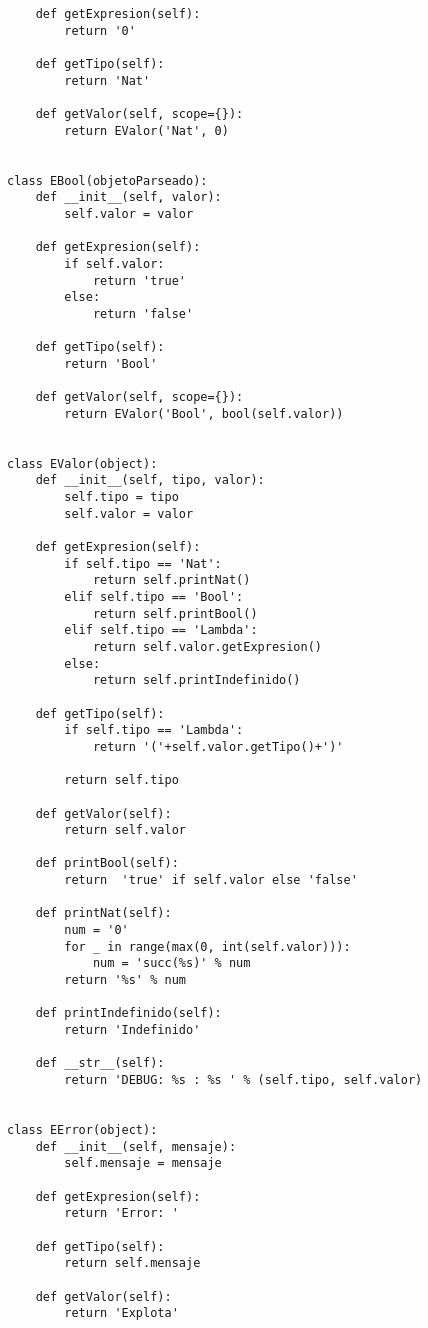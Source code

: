 \begin{verbatim}
    def getExpresion(self):
        return '0'
    
    def getTipo(self):
        return 'Nat'
    
    def getValor(self, scope={}):
        return EValor('Nat', 0)
    

class EBool(objetoParseado):
    def __init__(self, valor):
        self.valor = valor

    def getExpresion(self):
        if self.valor:
            return 'true'
        else:
            return 'false'
    
    def getTipo(self):
        return 'Bool'

    def getValor(self, scope={}):
        return EValor('Bool', bool(self.valor))


class EValor(object):
    def __init__(self, tipo, valor):
        self.tipo = tipo
        self.valor = valor

    def getExpresion(self):
        if self.tipo == 'Nat':
            return self.printNat()
        elif self.tipo == 'Bool':
            return self.printBool()
        elif self.tipo == 'Lambda':
            return self.valor.getExpresion()
        else:
            return self.printIndefinido()

    def getTipo(self):
        if self.tipo == 'Lambda':
            return '('+self.valor.getTipo()+')'

        return self.tipo

    def getValor(self):
        return self.valor

    def printBool(self):
        return  'true' if self.valor else 'false'
    
    def printNat(self):
        num = '0'
        for _ in range(max(0, int(self.valor))):
            num = 'succ(%s)' % num        
        return '%s' % num

    def printIndefinido(self):
        return 'Indefinido'

    def __str__(self):
        return 'DEBUG: %s : %s ' % (self.tipo, self.valor)


class EError(object):
    def __init__(self, mensaje):
        self.mensaje = mensaje

    def getExpresion(self):
        return 'Error: '

    def getTipo(self):
        return self.mensaje

    def getValor(self):
        return 'Explota'

\end{verbatim}

